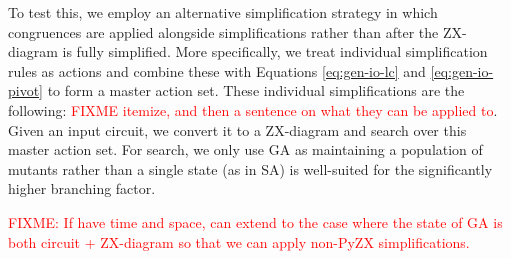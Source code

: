 To test this, we employ an alternative simplification strategy in which congruences are applied alongside simplifications rather than after the ZX-diagram is fully simplified.
More specifically, we treat individual simplification rules as actions and combine these with Equations \ref{eq:gen-io-lc} and \ref{eq:gen-io-pivot} to form a master action set.
These individual simplifications are the following: \textcolor{red}{FIXME itemize, and then a sentence on what they can be applied to}.
Given an input circuit, we convert it to a ZX-diagram and search over this master action set.
For search, we only use GA as maintaining a population of mutants rather than a single state (as in SA) is well-suited for the significantly higher branching factor.

\textcolor{red}{FIXME: If have time and space, can extend to the case where the state of GA is both circuit + ZX-diagram so that we can apply non-PyZX simplifications.}









\fi
